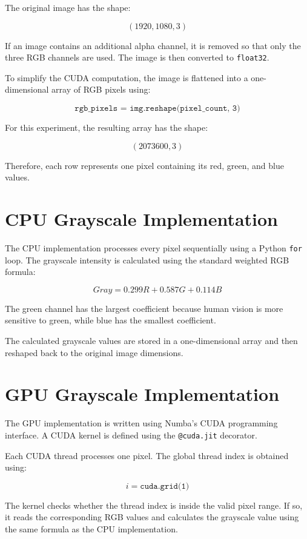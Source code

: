 \documentclass[11pt]{article}
\begin{document}
The original image has the shape:

$$
(1920,1080,3)
$$

If an image contains an additional alpha channel, it is removed so that only the three RGB channels are used. The image is then converted to \texttt{float32}.

To simplify the CUDA computation, the image is flattened into a one-dimensional array of RGB pixels using:

$$
\texttt{rgb\_pixels = img.reshape(pixel\_count, 3)}
$$

For this experiment, the resulting array has the shape:

$$
(2073600,3)
$$

Therefore, each row represents one pixel containing its red, green, and blue values.

\section{CPU Grayscale Implementation}

The CPU implementation processes every pixel sequentially using a Python \texttt{for} loop. The grayscale intensity is calculated using the standard weighted RGB formula:

$$
Gray = 0.299R + 0.587G + 0.114B
$$

The green channel has the largest coefficient because human vision is more sensitive to green, while blue has the smallest coefficient.

The calculated grayscale values are stored in a one-dimensional array and then reshaped back to the original image dimensions.

\section{GPU Grayscale Implementation}

The GPU implementation is written using Numba's CUDA programming interface. A CUDA kernel is defined using the \texttt{@cuda.jit} decorator.

Each CUDA thread processes one pixel. The global thread index is obtained using:
 
$$
i = \texttt{cuda.grid(1)}
$$

The kernel checks whether the thread index is inside the valid pixel range. If so, it reads the corresponding RGB values and calculates the grayscale value using the same formula as the CPU implementation.
\end{document}
